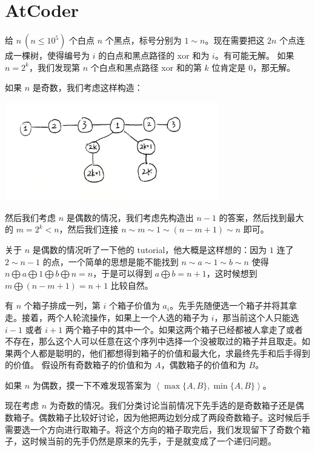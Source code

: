 \section{AtCoder}


\prob 给 $n\ (n\le 10^5)$ 个白点 $n$ 个黑点，标号分别为 $1\sim n$。现在需要把这 $2n$ 个点连成一棵树，使得编号为 $i$ 的白点和黑点路径的 xor 和为 $i$。有可能无解。
\sol 如果 $n=2^k$，我们发现第 $n$ 个白点和黑点路径 xor 和的第 $k$ 位肯定是 $0$，那无解。

如果 $n$ 是奇数，我们考虑这样构造：

\begin{center}
    \includegraphics[width=0.7\textwidth]{solutions/img/agc035c/agc035c.jpg}
\end{center}

然后我们考虑 $n$ 是偶数的情况，我们考虑先构造出 $n-1$ 的答案，然后找到最大的 $m=2^k<n$，然后我们连接 $n\sim m\sim 1\sim (n-m+1)\sim n$ 即可。

关于 $n$ 是偶数的情况听了一下他的 tutorial，他大概是这样想的：因为 $1$ 连了 $2\sim n-1$ 的点，一个简单的思想是能不能找到 $n\sim a\sim 1\sim b\sim n$ 使得 $n\bigoplus a\bigoplus 1\bigoplus b\bigoplus n=n$，于是可以得到 $a\bigoplus b=n+1$，这时候想到 $m\bigoplus (n-m+1)=n+1$ 比较自然。


\prob 有 $n$ 个箱子排成一列，第 $i$ 个箱子价值为 $a_i$。先手先随便选一个箱子并将其拿走。接着，两个人轮流操作，如果上一个人选的箱子为 $i$，那当前这个人只能选 $i-1$ 或者 $i+1$ 两个箱子中的其中一个。如果这两个箱子已经都被人拿走了或者不存在，那么这个人可以任意在这个序列中选择一个没被取过的箱子并且取走。如果两个人都是聪明的，他们都想得到箱子的价值和最大化，求最终先手和后手得到的价值。
\sol 假设所有奇数箱子的价值和为 $A$，偶数箱子的价值和为 $B$。

如果 $n$ 为偶数，摸一下不难发现答案为 $\left<\max\{A, B\}, \min\{A, B\}\right>$。

现在考虑 $n$ 为奇数的情况。我们分类讨论当前情况下先手选的是奇数箱子还是偶数箱子。偶数箱子比较好讨论，因为他把两边划分成了两段奇数箱子。这时候后手需要选一个方向进行取箱子。将这个方向的箱子取完后，我们发现留下了奇数个箱子，这时候当前的先手仍然是原来的先手，于是就变成了一个递归问题。

